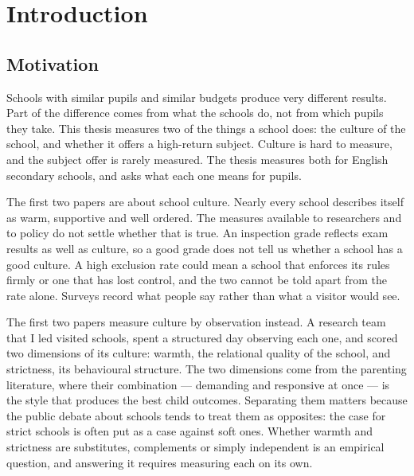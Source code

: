 \chapter{Introduction}
\label{ch:introduction}
\resetcounterformats


\section{Motivation}
\label{sec:intro_motivation}

Schools with similar pupils and similar budgets produce very different
results. Part of the difference comes from what the schools do, not from
which pupils they take. This thesis measures two of the things a school
does: the culture of the school, and whether it offers a high-return
subject. Culture is hard to measure, and the subject offer is rarely
measured. The thesis measures both for English secondary schools, and asks
what each one means for pupils.

The first two papers are about school culture. Nearly every school describes itself
as warm, supportive and well ordered. The measures available to researchers
and to policy do not settle whether that is true. An inspection grade
reflects exam results as well as culture, so a good grade does not tell us
whether a school has a good culture. A high exclusion rate could mean a school that enforces its rules
firmly or one that has lost control, and the two cannot be told apart from
the rate alone. Surveys record what people say rather than what a visitor would
see.

The first two papers measure culture by observation instead. A research team that I led
visited \NTierOne{} schools, spent a structured day observing each one, and scored
two dimensions of its culture: warmth, the relational quality of the school,
and strictness, its behavioural structure. The two dimensions come from the
parenting literature, where their combination --- demanding and responsive
at once --- is the style that produces the best child outcomes. Separating
them matters because the public debate about schools tends to treat them as
opposites: the case for strict schools is often put as a case against soft
ones. Whether warmth and strictness are substitutes, complements or simply
independent is an empirical question, and answering it requires measuring
each on its own.

